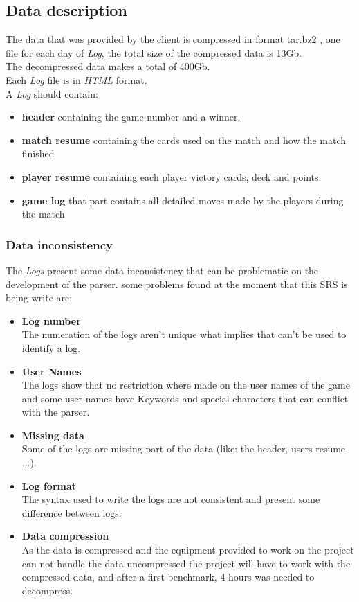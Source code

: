 \documentclass{scrreprt}
\begin{document}
\subsection{Data description}
The data that was provided by the client is compressed in format tar.bz2 , one file for each day of \textit{Log}, the total size of the compressed data is
13Gb.\\
The decompressed data makes a total of 400Gb.\\
Each \textit{Log} file is in \textit{HTML} format.\\
A \textit{Log} should contain:
\begin{itemize}
  \item{\textbf{header}} containing the game number and a winner.
  \item{\textbf{match resume}} containing the cards used on the match and how the match
    finished
  \item{\textbf{player resume}} containing each player victory cards, deck and points.
  \item{\textbf{game log}} that part contains all detailed moves made by the players
    during the match
\end{itemize}

\subsubsection{Data inconsistency}
The \textit{Logs} present some data inconsistency that can be problematic on the
development of the parser.
some problems found at the moment that this SRS is being write are:
\begin{itemize}
  \item \textbf{Log number}\\
    The numeration of the logs aren't unique what implies that can't be used to
    identify a log.
  \item \textbf{User Names}\\
    The logs show that no restriction where made on the user names of the game
    and some user names have Keywords and special characters that can conflict
    with the parser.
   \item \textbf{Missing data}\\
     Some of the logs are missing part of the data (like: the header, users
     resume $\ldots$).
   \item \textbf{Log format}\\
     The syntax used to write the logs are not consistent and present some
     difference between logs.
    \item \textbf{Data compression}\\
      As the data is compressed and the equipment provided to work on the
      project can not handle the data uncompressed the project will have to work
      with the compressed data, and after a first benchmark, 4 hours was needed
      to decompress.
\end{itemize}
\end{document}
